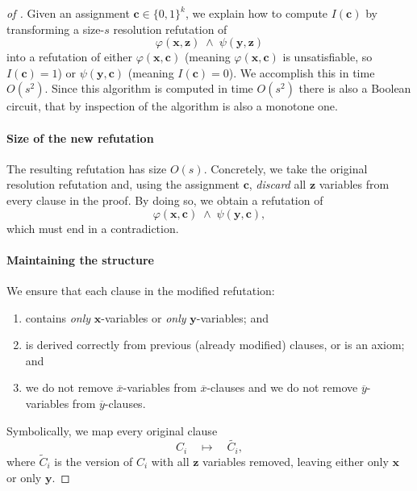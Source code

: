 \bigskip 


\begin{proof}[of ]
Given an assignment \(\mathbf{c} \in \{0,1\}^k\), we explain how to compute \(I(\mathbf{c})\) by transforming a size-\(s\) resolution refutation of
\[
\varphi(\mathbf{x},\mathbf{z}) \;\wedge\; \psi(\mathbf{y},\mathbf{z})
\]
into a refutation of either \(\varphi(\mathbf{x}, \mathbf{c})\) (meaning \(\varphi(\mathbf{x}, \mathbf{c})\) is unsatisfiable, so \(I(\mathbf{c}) = 1\)) or \(\psi(\mathbf{y}, \mathbf{c})\) (meaning \(I(\mathbf{c}) = 0\)). We accomplish this in time \(O(s^2)\).
Since this algorithm is computed in time $O(s^2)$ there is also a Boolean circuit, that by inspection of the algorithm is also a monotone one. 



\paragraph{Size of the new refutation}
The resulting refutation has size \(O(s)\). Concretely, we take the original resolution refutation and, using the assignment \(\mathbf{c}\), \emph{discard} all \(\mathbf{z}\) variables from every clause in the proof. By doing so, we obtain a refutation of
\[
\varphi(\mathbf{x},\mathbf{c}) \;\wedge\; \psi(\mathbf{y},\mathbf{c}),
\]
which must end in a contradiction.

\paragraph{Maintaining the structure}
We ensure that each clause in the modified refutation:
\begin{enumerate}
\item 
  contains \emph{only} \(\mathbf{x}\)-variables or \emph{only} \(\mathbf{y}\)-variables; and 

\item  is derived correctly from previous (already modified) clauses, or is an axiom; and

\item we do not remove $\overline x$-variables 
 from $\overline x$-clauses and  
we do not remove $\overline y$-variables 
 from $\overline y$-clauses.
 
\end{enumerate}

Symbolically, we map every original clause
\[
C_i \quad\longmapsto\quad \widetilde{C_i},
\]
where \(\widetilde C_i\) is the version of \(C_i\) with all \(\mathbf{z}\) variables removed, leaving either only \(\mathbf{x}\) or only \(\mathbf{y}\).


\end{proof}
